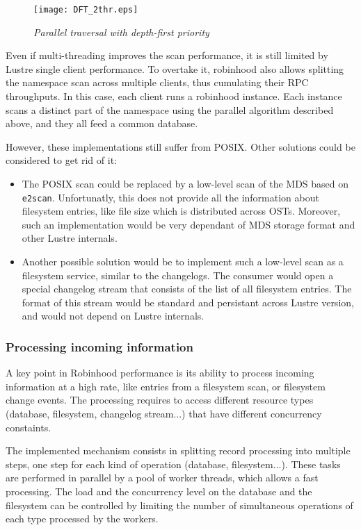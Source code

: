 \documentclass[conference]{IEEEtran}
\begin{document}
\begin{figure}[here]
\centering
\texttt{[image: DFT\_2thr.eps]}
\caption{\it Parallel traversal with depth-first priority }
\label{fig:dft_multi}
\end{figure}

Even if multi-threading improves the scan performance, it is still limited by Lustre single client performance.
To overtake it, robinhood also allows splitting the namespace scan across multiple clients, thus cumulating their RPC throughputs.  In this case, each client runs a robinhood instance. Each instance scans a distinct part of the namespace using the parallel algorithm described above, and they all feed a common database.

However, these implementations still suffer from POSIX. Other solutions could be considered to get rid of it:
\begin{itemize}
\item The POSIX scan could be replaced by a low-level scan of the MDS based on {\tt e2scan}. Unfortunatly, this does not provide all the information about filesystem entries, like file size which is distributed across OSTs. Moreover, such an implementation would be very dependant of MDS storage format and other Lustre internals.
\item Another possible solution would be to implement such a low-level scan as a filesystem service, similar to the changelogs.
The consumer would open a spe\-cial changelog stream that consists of the list of all filesystem entries. The format of this stream would be standard and persistant across Lustre version, and would not depend on Lustre internals.
\end{itemize}

\subsubsection{Processing incoming information}
A key point in Ro\-bin\-hood performance is its ability to process
incoming in\-for\-ma\-tion at a high rate, like entries from a filesystem
scan, or filesystem change events.  The processing requires to access different
resource types (database, filesystem, changelog stream...)
that have different concurrency constaints.

The implemented mechanism consists in splitting record processing into multiple steps, one step for each kind of operation (database, filesystem...).  These tasks are performed in parallel by a pool of worker threads, which allows a fast processing. The load and the concurrency level on the database and the filesystem can be controlled by limiting the number of simultaneous operations of each type processed by the workers.
\end{document}
